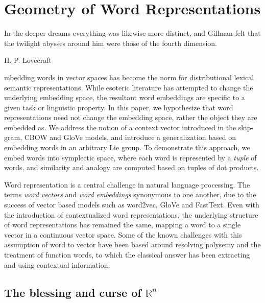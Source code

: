 \documentclass[11pt]{book}
\begin{document}
\chapter{Geometry of Word Representations}
\label{chapter:geometrization}

\epigraph{In the deeper dreams everything was likewise more distinct, and Gillman
felt that the twilight abysses around him were those of the fourth dimension.}{H. P. Lovecraft}


mbedding words in vector spaces has become the norm for
distributional lexical semantic representations. While esoteric literature has
attempted to change the underlying embedding space, the resultant word
embeddings are specific to a given task or linguistic property. In this paper,
we hypothesize that word representations need not change the embedding space,
rather the object they are embedded as. We address the notion of a context
vector introduced in the skip-gram, CBOW and GloVe models, and introduce a
generalization based on embedding words in an arbitrary Lie group. To
demonstrate this approach, we embed words into symplectic space, where each
word is represented by a \emph{tuple} of words, and similarity and analogy are
computed based on tuples of dot products.

Word representation is a central challenge in natural language processing. The
terms \emph{word vectors} and \emph{word embeddings} synonymous to one another,
due to the success of vector based models such as word2vec, GloVe and FastText.
Even with the introduction of contextualized word representations, the
underlying structure of word representations has remained the same, mapping a
word to a single vector in a continuous vector space. Some of the known
challenges with this assumption of word to vector have been based around
resolving polysemy and the treatment of function words, to which the classical
answer has been extracting and using contextual information.

\section{The blessing and curse of $\mathbb{R}^n$}
\end{document}
